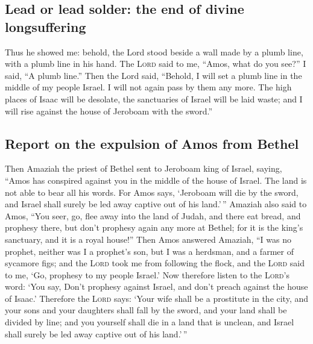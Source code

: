 \hypertarget{lead-or-lead-solder-the-end-of-divine-longsuffering}{%
\subsection{Lead or lead solder: the end of divine
longsuffering}\label{lead-or-lead-solder-the-end-of-divine-longsuffering}}

 Thus he showed me: behold, the Lord stood beside a wall
made by a plumb line, with a plumb line in his hand.  The
\textsc{Lord} said to me, ``Amos, what do you see?'' I said, ``A plumb
line.'' Then the Lord said, ``Behold, I will set a plumb line in the
middle of my people Israel. I will not again pass by them any more.
 The high places of Isaac will be desolate, the
sanctuaries of Israel will be laid waste; and I will rise against the
house of Jeroboam with the sword.''

\hypertarget{report-on-the-expulsion-of-amos-from-bethel}{%
\subsection{Report on the expulsion of Amos from
Bethel}\label{report-on-the-expulsion-of-amos-from-bethel}}

 Then Amaziah the priest of Bethel sent to Jeroboam king
of Israel, saying, ``Amos has conspired against you in the middle of the
house of Israel. The land is not able to bear all his words.
 For Amos says, `Jeroboam will die by the sword, and
Israel shall surely be led away captive out of his land.'\,''
 Amaziah also said to Amos, ``You seer, go, flee away
into the land of Judah, and there eat bread, and prophesy there,
 but don't prophesy again any more at Bethel; for it is
the king's sanctuary, and it is a royal house!''  Then
Amos answered Amaziah, ``I was no prophet, neither was I a prophet's
son, but I was a herdsman, and a farmer of sycamore figs;
 and the \textsc{Lord} took me from following the flock,
and the \textsc{Lord} said to me, `Go, prophesy to my people Israel.'
 Now therefore listen to the \textsc{Lord}'s word: `You
say, Don't prophesy against Israel, and don't preach against the house
of Isaac.'  Therefore the \textsc{Lord} says: `Your wife
shall be a prostitute in the city, and your sons and your daughters
shall fall by the sword, and your land shall be divided by line; and you
yourself shall die in a land that is unclean, and Israel shall surely be
led away captive out of his land.'\,''

